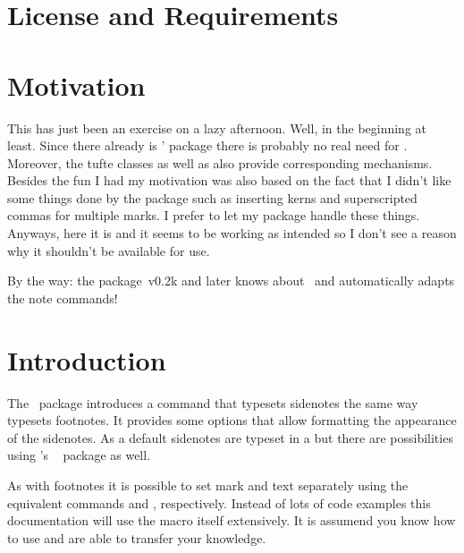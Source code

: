\documentclass[load-preamble+]{cnltx-doc}
\makeatletter
\newcommand*\defaultsidenotes{%
  \setsidenotes{
    note-mark-format = \@textsuperscript{\normalfont\normalcolor##1},
    text-format      = \normalfont\normalcolor\footnotesize
  }}
\makeatother
\begin{document}
\section{License and Requirements}\label{sec:license}
\license

\section{Motivation}\label{sec:motivation}
This has just been an exercise on a lazy
afternoon.  Well,
in the beginning at least.  Since there already is \thomas' 
package there is probably no real need for
\snotez.  Moreover, the tufte classes as well
as  also provide corresponding
mechanisms.  Besides the fun I had my motivation was also based on the fact
that I didn't like some things done by the  package such as
inserting kerns and superscripted commas for multiple marks.  I prefer to let
my  package handle these things.
Anyways, here it is and it seems to be working as intended so I don't see a
reason why it shouldn't be available for use.

By the way: the  package~v0.2k and later knows about \snotez\ and
automatically adapts the note commands!

\section{Introduction}\label{sec:introduction}
The \snotez\ package introduces a  command%
\begingroup\defaultsidenotes
{}
\endgroup
that typesets sidenotes the same way  typesets footnotes.  It
provides some options that allow formatting the appearance of the
sidenotes.  As a default sidenotes
are typeset in a  but there are possibilities using \kohm's
~\cite{pkg:marginnote} package as well.

As with footnotes it is possible to set mark and text separately using the
equivalent commands  and , respectively.
Instead of lots of code examples this documentation will use the 
macro itself extensively.  It is assumend you know how to use 
and are able to transfer your knowledge.
\end{document}
